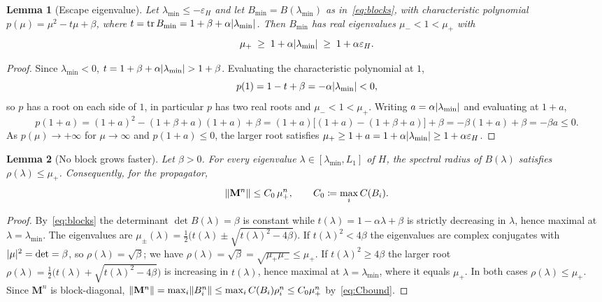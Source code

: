 \documentclass[11pt]{article}
\theoremstyle{plain}
\newtheorem{lemma}{Lemma}[section]
\theoremstyle{definition}
\theoremstyle{remark}
\DeclarePairedDelimiter{\norm}{\lVert}{\rVert}
\DeclarePairedDelimiter{\abs}{\lvert}{\rvert}
\DeclareMathOperator{\tr}{tr}
\newcommand{\eps}{\varepsilon}
\newcommand{\epsH}{\eps_{H}}
\newcommand{\Bmin}{B_{\min}}
\newcommand{\mup}{\mu_{+}}
\newcommand{\mum}{\mu_{-}}
\newcommand{\Mmat}{\mathbf{M}}
\begin{document}
\begin{lemma}[Escape eigenvalue]
\label{lem:escapeeig}
Let $\lambda_{\min}\le-\epsH$ and let $\Bmin=B(\lambda_{\min})$ as
in~\eqref{eq:blocks}, with characteristic polynomial
$p(\mu)=\mu^{2}-t\mu+\beta$, where
$t=\tr\Bmin=1+\beta+\alpha\abs{\lambda_{\min}}$. Then $\Bmin$ has real
eigenvalues $\mum<1<\mup$ with
\begin{equation}\label{eq:mup-lb}
  \mup\;\ge\;1+\alpha\abs{\lambda_{\min}}\;\ge\;1+\alpha\epsH.
\end{equation}
\end{lemma}

\begin{proof}
Since $\lambda_{\min}<0$, $t=1+\beta+\alpha\abs{\lambda_{\min}}>1+\beta$.
Evaluating the characteristic polynomial at $1$,
\[
  p(1)=1-t+\beta=-\alpha\abs{\lambda_{\min}}<0,
\]
so $p$ has a root on each side of $1$, in particular $p$ has two real
roots and $\mum<1<\mup$. Writing $a=\alpha\abs{\lambda_{\min}}$ and
evaluating at $1+a$,
\[
  p(1+a)=(1+a)^{2}-(1+\beta+a)(1+a)+\beta
  =(1+a)\big[(1+a)-(1+\beta+a)\big]+\beta=-\beta(1+a)+\beta=-\beta a\le0.
\]
As $p(\mu)\to+\infty$ for $\mu\to\infty$ and $p(1+a)\le0$, the larger
root satisfies $\mup\ge1+a=1+\alpha\abs{\lambda_{\min}}\ge1+\alpha\epsH$.
\end{proof}

\begin{lemma}[No block grows faster]
\label{lem:nofaster}
Let $\beta>0$. For every eigenvalue
$\lambda\in[\lambda_{\min},L_{1}]$ of $H$, the spectral radius of
$B(\lambda)$ satisfies $\rho(\lambda)\le\mup$. Consequently, for the
propagator,
\begin{equation}\label{eq:Mbound}
  \norm{\Mmat^{n}}\le C_{0}\,\mup^{n},\qquad C_{0}\coloneqq\max_{i}C(B_{i}).
\end{equation}
\end{lemma}

\begin{proof}
By~\eqref{eq:blocks} the determinant $\det B(\lambda)=\beta$ is constant
while $t(\lambda)=1-\alpha\lambda+\beta$ is strictly decreasing in
$\lambda$, hence maximal at $\lambda=\lambda_{\min}$. The eigenvalues are
$\mu_{\pm}(\lambda)=\tfrac12\big(t(\lambda)\pm\sqrt{t(\lambda)^{2}-4\beta}\big)$.
If $t(\lambda)^{2}<4\beta$ the eigenvalues are complex conjugates with
$\abs{\mu}^{2}=\det=\beta$, so $\rho(\lambda)=\sqrt{\beta}$; we have
$\rho(\lambda)=\sqrt\beta = \sqrt{\mup \mum} \leq \mup$. If $t(\lambda)^{2}\ge4\beta$ the
larger root
$\rho(\lambda)=\tfrac12\big(t(\lambda)+\sqrt{t(\lambda)^{2}-4\beta}\big)$
is increasing in $t(\lambda)$, hence maximal at $\lambda=\lambda_{\min}$,
where it equals $\mup$. In both cases $\rho(\lambda)\le\mup$. Since
$\Mmat^{n}$ is block-diagonal,
$\norm{\Mmat^{n}}=\max_{i}\norm{B_{i}^{n}}\le\max_{i}C(B_{i})\rho_{i}^{n}
\le C_{0}\mup^{n}$ by~\eqref{eq:Cbound}.
\end{proof}
\end{document}
